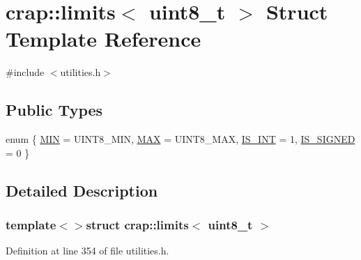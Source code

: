 \hypertarget{structcrap_1_1limits_3_01uint8__t_01_4}{}\section{crap\+:\+:limits$<$ uint8\+\_\+t $>$ Struct Template Reference}
\label{structcrap_1_1limits_3_01uint8__t_01_4}


{\ttfamily \#include $<$utilities.\+h$>$}

\subsection*{Public Types}
\begin{DoxyCompactItemize}
\item 
enum \{ \hyperlink{structcrap_1_1limits_3_01uint8__t_01_4_a8ab9ce8c8fe0fd07af1397224a12fe54a4a83b22dae2ce09dd72bf5cb29687118}{M\+I\+N} = U\+I\+N\+T8\+\_\+\+M\+I\+N, 
\hyperlink{structcrap_1_1limits_3_01uint8__t_01_4_a8ab9ce8c8fe0fd07af1397224a12fe54a782ec620bbe79358c648f5a6784338f2}{M\+A\+X} = U\+I\+N\+T8\+\_\+\+M\+A\+X, 
\hyperlink{structcrap_1_1limits_3_01uint8__t_01_4_a8ab9ce8c8fe0fd07af1397224a12fe54ab6923c8e2e67eb18afa6948d4af638a3}{I\+S\+\_\+\+I\+N\+T} = 1, 
\hyperlink{structcrap_1_1limits_3_01uint8__t_01_4_a8ab9ce8c8fe0fd07af1397224a12fe54a31ea108f27c14dd7936d14e0bbfaf293}{I\+S\+\_\+\+S\+I\+G\+N\+E\+D} = 0
 \}
\end{DoxyCompactItemize}


\subsection{Detailed Description}
\subsubsection*{template$<$$>$struct crap\+::limits$<$ uint8\+\_\+t $>$}



Definition at line 354 of file utilities.\+h.



